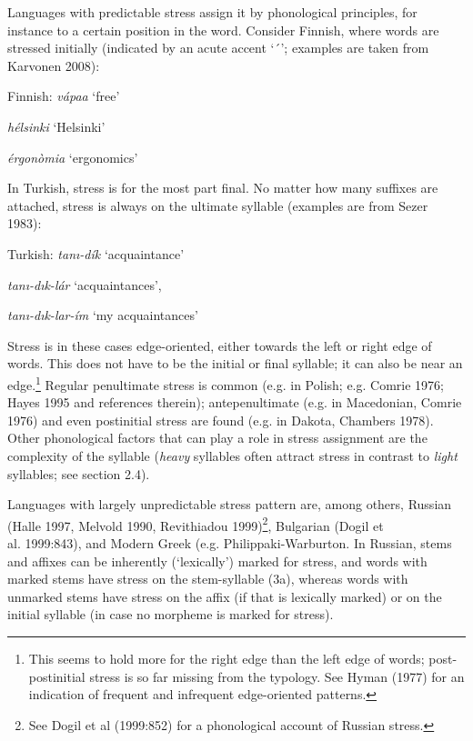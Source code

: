 \documentclass[a4paper]{article}
\begin{document}
Languages with predictable stress assign it by phonological principles, for instance to a certain position in the word. Consider Finnish, where words are stressed initially (indicated by an acute accent ‘´’; examples are taken from Karvonen 2008):


\ea Finnish:
{
\textit{vápaa} ‘free’}

{
\textit{hélsinki} ‘Helsinki’}

{
\textit{érgonòmia} ‘ergonomics’}
\z

In Turkish, stress is for the most part final. No matter how many suffixes are attached, stress is always on the ultimate syllable (examples are from Sezer 1983):

\ea Turkish:
{
\textit{tanı-dík} ‘acquaintance’}

{
\textit{tanı-dık-lár} ‘acquaintances’, }

{
\textit{tanı-dık-lar-ím} ‘my acquaintances’ }
\z

Stress is in these cases edge-oriented, either towards the left or right edge of words. This does not have to be the initial or final syllable; it can also be near an edge.\footnote{ This seems to hold more for the right edge than the left edge of words; post-postinitial stress is so far missing from the typology. See Hyman (1977) for an indication of frequent and infrequent edge-oriented patterns.} Regular penultimate stress is common (e.g. in Polish; e.g. Comrie 1976; Hayes 1995 and references therein); antepenultimate (e.g. in Macedonian, Comrie 1976) and even postinitial stress are found (e.g. in Dakota, Chambers 1978). Other phonological factors that can play a role in stress assignment are the complexity of the syllable (\textit{heavy} syllables often attract stress in contrast to \textit{light} syllables; see section 2.4).

Languages with largely unpredictable stress pattern are, among others, Russian (Halle 1997, Melvold 1990, Revithiadou 1999)\footnote{ See Dogil et al (1999:852) for a phonological account of Russian stress.}, Bulgarian (Dogil et\\\noindent al. 1999:843), and Modern Greek (e.g. {Philippaki-Warburton}. In Russian, stems and affixes can be inherently (‘lexically’) marked for stress, and words with marked stems have stress on the stem-syllable (3a), whereas words with unmarked stems have stress on the affix (if that is lexically marked) or on the initial syllable (in case no morpheme is marked for stress).
\end{document}
